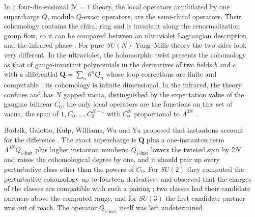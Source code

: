\documentclass[11pt]{article}
\numberwithin{equation}{section}
\numberwithin{figure}{section}
\numberwithin{table}{section}
\theoremstyle{definition}
\newcommand{\Qp}{\mathbf Q}
\newcommand{\Qi}{Q_{1\text{-}\mathrm{inst}}}
\begin{document}
In a four-dimensional $\mathcal N=1$ theory, the local operators annihilated by one supercharge $Q$, modulo $Q$-exact operators, are the semi-chiral operators. Their cohomology contains the chiral ring and is invariant along the renormalization group flow, so it can be compared between an ultraviolet Lagrangian description and the infrared phase \cite[Section~1]{semichiral}. For pure $SU(N)$ Yang--Mills theory the two sides look very different. In the ultraviolet, the holomorphic twist presents the cohomology as that of gauge-invariant polynomials in the derivatives of two fields $b$ and $c$, with a differential $\Qp=\sum_n\hbar^nQ_n$ whose loop corrections are finite and computable \cite{semichiral,BK,LLCh}; its cohomology is infinite dimensional. In the infrared, the theory confines and has $N$ gapped vacua, distinguished by the expectation value of the gaugino bilinear $C_0$; the only local operators are the functions on this set of vacua, the span of $1,C_0,\dots,C_0^{N-1}$ with $C_0^N$ proportional to $\Lambda^{3N}$ \cite{VY}.

Budzik, Gaiotto, Kulp, Williams, Wu and Yu proposed that instantons account for the difference \cite[Section~8]{semichiral}. The exact supercharge is $\Qp$ plus a one-instanton term $\Lambda^{3N}\Qi$ plus higher instanton numbers; $\Qi$ lowers the twisted spin by $2N$ and raises the cohomological degree by one, and it should pair up every perturbative class other than the powers of $C_0$. For $SU(2)$ they computed the perturbative cohomology up to fourteen derivatives and observed that the charges of the classes are compatible with such a pairing \cite[Equation~(8.11)]{semichiral}; two classes had their candidate partners above the computed range, and for $SU(3)$ the first candidate partner was out of reach. The operator $\Qi$ itself was left undetermined.
\end{document}
